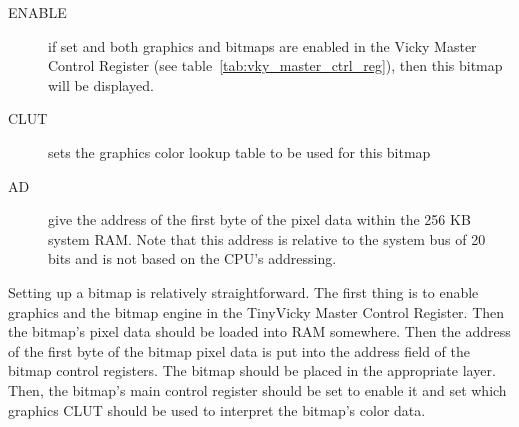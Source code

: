 \begin{description}
    \item[ENABLE] if set and both graphics and bitmaps are enabled in the Vicky Master Control Register (see table~\ref{tab:vky_master_ctrl_reg}), then this bitmap will be displayed.

    \item[CLUT] sets the graphics color lookup table to be used for this bitmap

    \item[AD] give the address of the first byte of the pixel data within the 256 KB system RAM. Note that this address is relative to the system bus of 20 bits and is not based on the CPU's addressing.
\end{description}

Setting up a bitmap is relatively straightforward. The first thing is to enable graphics and the bitmap engine in the TinyVicky Master Control Register. Then the bitmap's pixel data should be loaded into RAM somewhere. Then the address of the first byte of the bitmap pixel data is put into the address field of the bitmap control registers. The bitmap should be placed in the appropriate layer. Then, the bitmap's main control register should be set to enable it and set which graphics CLUT should be used to interpret the bitmap's color data.
